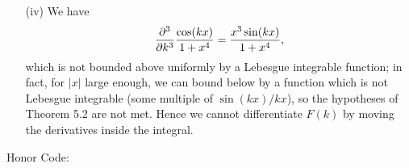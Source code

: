 \documentclass[11pt]{article}
\begin{document}
\begin{enumerate}
\begin{enumerate}
        \item[(iv)] We have \[\pdv[3]{k} \frac{\cos(kx)}{1+x^4} = \frac{x^3\sin(kx)}{1+x^4},\] which is not bounded above uniformly by a Lebesgue integrable function; in fact, for $|x|$ large enough, we can bound below by a function which is not Lebesgue integrable (some multiple of $\sin(kx)/kx$), so the hypotheses of Theorem 5.2 are not met. Hence we cannot differentiate $F(k)$ by moving the derivatives inside the integral.
    \end{enumerate}   
    \hrulefill
\end{enumerate}
Honor Code: \vspace*{7em}
\end{document}
